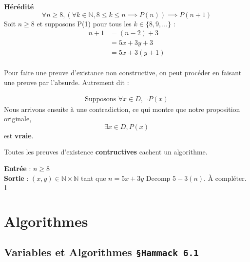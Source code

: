 \documentclass[16pt]{report}
\begin{document}
\begin{multicols*}{2}
\begin{Preuve}{}{}
                \textbf{Hérédité} 
                \[ \forall n \geq 8, (\forall k \in \mathbb{N}, 8 \leq k \leq n 
                \implies P(n)) \implies P(n+1) \]
                Soit $n \geq 8$ et supposons P(1) pour tous les 
                $k \in \{8, 9, \dots\}$ : 
                \begin{align*}
                    n+1 &= (n-2) + 3 \\ 
                            &= 5x + 3y +3 \\ 
                            &= 5x +3(y+1) \\
                \end{align*}
            \end{Preuve}


            Pour faire une preuve d'existance non constructive, on peut procéder en 
            faisant une preuve par l'absurde. Autrement dit : 
            
            \begin{align*}
                \text{Supposons } \forall x \in D, \neg P(x) 
            \end{align*}
            Nous arrivons ensuite à une contradiction, ce qui montre que notre 
            proposition originale,  
                            \[ \exists x \in D, P(x) \]
            est \textbf{vraie}.   
        

            \begin{note}{}{}
                Toutes les preuves d'existence \textbf{contructives} cachent un 
                algorithme. 
            \end{note}

            \begin{EExample}{}{}
                \textbf{Entrée} : $n \geq 8$ \\ 
                \textbf{Sortie} : $(x, y) \in \mathbb{N} \times \mathbb{N}$ tant que 
                $n = 5x + 3y$ 
                Decomp $5 -3(n)$. À compléter. 
                1
            \end{EExample}

    \chapter{Algorithmes}

    \section{Variables et Algorithmes \texttt{\small{\S Hammack 6.1}  }}


\end{multicols*}
\end{document}
